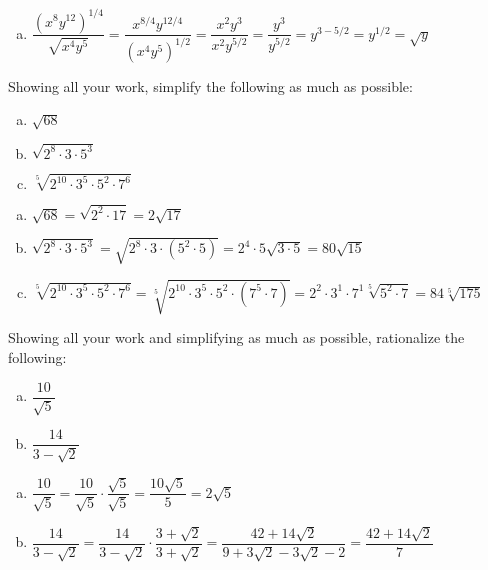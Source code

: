 \documentclass[12pt,letterpaper]{exam}
\begin{document}
\begin{questions}
\begin{enumerate}[(a)]
\item $\dfrac{(x^8 y^{12})^{1/4}}{\sqrt{x^4 y^5}}= \dfrac{x^{8/4} y^{12/4}}{(x^4 y^5)^{1/2}}= \dfrac{x^2 y^3}{x^2 y^{5/2}}= \dfrac{y^3}{y^{5/2}}= y^{3 - 5/2}= y^{1/2}= \sqrt{y}$
\end{enumerate}



\newpage
\question[10] Showing all your work, simplify the following as much as possible:
	\begin{enumerate}[(a)]
	\item $\sqrt{68}$
	\item $\sqrt{2^8 \cdot 3 \cdot 5^3}$
	\item $\sqrt[5]{2^{10} \cdot 3^5 \cdot 5^2 \cdot 7^6}$
	\end{enumerate} \pspace

\sol 
\begin{enumerate}[(a)]
\item $\sqrt{68}= \sqrt{2^2 \cdot 17}= 2 \sqrt{17}$ \pspace

\item $\sqrt{2^8 \cdot 3 \cdot 5^3}= \sqrt{2^8 \cdot 3 \cdot (5^2 \cdot 5)}= 2^4 \cdot 5 \sqrt{3 \cdot 5}= 80 \sqrt{15}$ \pspace

\item $\sqrt[5]{2^{10} \cdot 3^5 \cdot 5^2 \cdot 7^6}= \sqrt[5]{2^{10} \cdot 3^5 \cdot 5^2 \cdot (7^5 \cdot 7)}= 2^2 \cdot 3^1 \cdot 7^1 \sqrt[5]{5^2 \cdot 7}= 84 \sqrt[5]{175}$
\end{enumerate}



\newpage
\question[10] Showing all your work and simplifying as much as possible, rationalize the following:
	\begin{enumerate}[(a)] \itemsep=0.3cm
	\item $\dfrac{10}{\sqrt{5}}$
	\item $\dfrac{14}{3 - \sqrt{2}}$
	\end{enumerate} \pspace

\sol
\begin{enumerate}[(a)]
\item $\dfrac{10}{\sqrt{5}}= \dfrac{10}{\sqrt{5}} \cdot \dfrac{\sqrt{5}}{\sqrt{5}}= \dfrac{10 \sqrt{5}}{5}= 2 \sqrt{5}$ \pspace

\item $\dfrac{14}{3 - \sqrt{2}}= \dfrac{14}{3 - \sqrt{2}} \cdot \dfrac{3 + \sqrt{2}}{3 + \sqrt{2}}= \dfrac{42 + 14 \sqrt{2}}{9 + 3\sqrt{2} - 3\sqrt{2} - 2}= \dfrac{42 + 14 \sqrt{2}}{7}$
\end{enumerate}




\end{questions}
\end{document}
